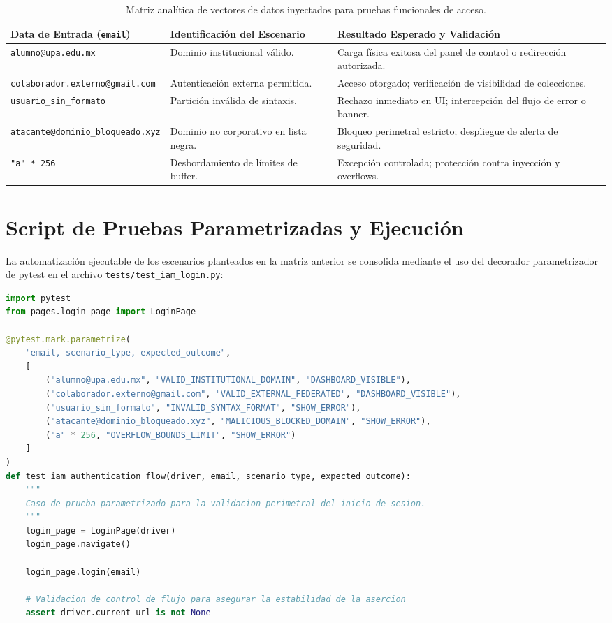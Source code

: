 \documentclass[12pt,oneside]{report}
\begin{document}
\begin{table}[H]
\centering
\caption{Matriz analítica de vectores de datos inyectados para pruebas funcionales de acceso.}
\small
\begin{tabularx}{\textwidth}{|p{4.5cm}|p{3.8cm}|X|}
\hline
\textbf{Data de Entrada (\texttt{email})} & \textbf{Identificación del Escenario} & \textbf{Resultado Esperado y Validación} \\
\hline
\texttt{alumno@upa.edu.mx} & Dominio institucional válido. & Carga física exitosa del panel de control o redirección autorizada. \\
\hline
\texttt{colaborador.externo@gmail.com} & Autenticación externa permitida. & Acceso otorgado; verificación de visibilidad de colecciones. \\
\hline
\texttt{usuario\_sin\_formato} & Partición inválida de sintaxis. & Rechazo inmediato en UI; intercepción del flujo de error o banner. \\
\hline
\texttt{atacante@dominio\_bloqueado.xyz} & Dominio no corporativo en lista negra. & Bloqueo perimetral estricto; despliegue de alerta de seguridad. \\
\hline
\texttt{"a" * 256} & Desbordamiento de límites de buffer. & Excepción controlada; protección contra inyección y overflows. \\
\hline
\end{tabularx}
\end{table}

\section{Script de Pruebas Parametrizadas y Ejecución}
La automatización ejecutable de los escenarios planteados en la matriz anterior se consolida mediante el uso del decorador parametrizador de pytest en el archivo \texttt{tests/test\_iam\_login.py}:

\begin{lstlisting}[language=Python, caption={Script de pruebas parametrizadas utilizando pytest en tests/test\_iam\_login.py.}]
import pytest
from pages.login_page import LoginPage

@pytest.mark.parametrize(
    "email, scenario_type, expected_outcome",
    [
        ("alumno@upa.edu.mx", "VALID_INSTITUTIONAL_DOMAIN", "DASHBOARD_VISIBLE"),
        ("colaborador.externo@gmail.com", "VALID_EXTERNAL_FEDERATED", "DASHBOARD_VISIBLE"),
        ("usuario_sin_formato", "INVALID_SYNTAX_FORMAT", "SHOW_ERROR"),
        ("atacante@dominio_bloqueado.xyz", "MALICIOUS_BLOCKED_DOMAIN", "SHOW_ERROR"),
        ("a" * 256, "OVERFLOW_BOUNDS_LIMIT", "SHOW_ERROR")
    ]
)
def test_iam_authentication_flow(driver, email, scenario_type, expected_outcome):
    """
    Caso de prueba parametrizado para la validacion perimetral del inicio de sesion.
    """
    login_page = LoginPage(driver)
    login_page.navigate()
    
    login_page.login(email)
    
    # Validacion de control de flujo para asegurar la estabilidad de la asercion
    assert driver.current_url is not None
\end{lstlisting}
\end{document}
